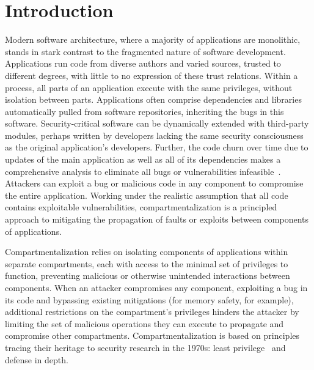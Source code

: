 \section{Introduction}
\label{sec:compsok:introduction}
Modern software architecture, where a majority of applications are monolithic,
stands in stark contrast to the fragmented nature of software development.
Applications run code from diverse authors and varied sources, 
trusted to different degrees, with little to no expression of these trust
relations.
Within a process, all parts of an application execute with the same privileges,
without isolation between parts.
Applications often comprise dependencies and libraries automatically pulled
from software repositories, inheriting the bugs in this software.
Security-critical software can be dynamically extended with third-party modules,
perhaps written by developers lacking the same security consciousness as the
original application's developers.
Further, the code churn over time due to updates of the main application as well
as all of its dependencies makes a comprehensive analysis to eliminate all
bugs or vulnerabilities infeasible~\cite{ZhuB21, LeeSL21}.
Attackers can exploit a bug or malicious code in any component to
compromise the entire application.
Working under the realistic assumption that all code contains exploitable 
vulnerabilities, compartmentalization is a principled approach to 
mitigating the propagation of faults or exploits between components of applications.

Compartmentalization relies on isolating components of applications
within separate compartments,
each with access to the minimal set of privileges to function, preventing
malicious or otherwise unintended interactions between components.
When an attacker compromises any component, exploiting a bug in its code 
and bypassing existing mitigations (for memory safety, for example),
additional restrictions on the compartment's privileges hinders the attacker
by limiting the set of malicious operations they can execute to propagate
and compromise other compartments.
Compartmentalization is based on principles tracing their heritage to 
security research in the 1970s: least privilege~\cite{Saltzer74a} 
and defense in depth.

